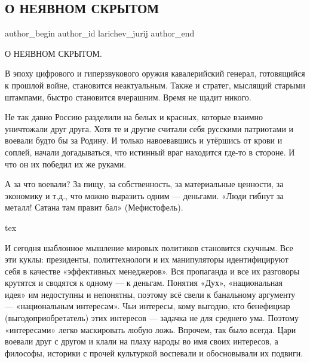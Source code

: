  
 
 
 
 
 
\subsection{О НЕЯВНОМ СКРЫТОМ}
\label{sec:03_09_2021.fb.larichev_jurij.1.liderstvo_nacia_rossia}
 
\ifcmt
 author_begin
   author_id larichev_jurij
 author_end
\fi

О НЕЯВНОМ СКРЫТОМ.

В эпоху цифрового и гиперзвукового оружия кавалерийский генерал, готовящийся к
прошлой войне, становится неактуальным. Также и стратег, мыслящий старыми
штампами, быстро становится вчерашним. Время не щадит никого.

Не так давно Россию разделили на белых и красных, которые взаимно уничтожали
друг друга. Хотя те и другие считали себя русскими патриотами и воевали будто
бы за Родину. И только навоевавшись и утёршись от крови и соплей, начали
догадываться, что истинный враг находится где-то в стороне. И что он их победил
их же руками.

А за что воевали? За пищу, за собственность, за материальные ценности, за
экономику и т.д., что можно выразить одним — деньгами. «Люди гибнут за металл!
Сатана там правит бал» (Мефистофель).

\ifcmt
  tex  
\fi

И сегодня шаблонное мышление мировых политиков становится скучным. Все эти
куклы: президенты, политтехнологи и их манипуляторы идентифицируют себя в
качестве «эффективных менеджеров». Вся пропаганда и все их разговоры крутятся и
сводятся к одному — к деньгам. Понятия «Дух», «национальная идея» им недоступны
и непонятны, поэтому всё свели к банальному аргументу — «национальным
интересам». Чьи интересы, кому выгодно, кто бенефициар (выгодоприобретатель)
этих интересов — задачка не для среднего ума. Поэтому «интересами» легко
маскировать любую ложь. Впрочем, так было всегда. Цари воевали друг с другом и
клали на плаху народы во имя своих интересов, а философы, историки с прочей
культуркой воспевали и обосновывали их подвиги.

